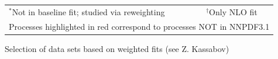 \documentclass{beamer}
\begin{document}
\begin{frame}
\begin{tabularx}{\textwidth}{llXr}
 \multicolumn{3}{l}{$^*$Not in baseline fit; studied via reweighting} &
 \multicolumn{1}{l}{$^\dag$Only NLO fit}\\
 \multicolumn{4}{l}{Processes highlighted in \alert{red} correspond to processes NOT in NNPDF3.1}\\
 \end{tabularx}
 \vspace{-0.2cm}
 \scriptsize
 \begin{block}{}
  \centering
  Selection of data sets based on weighted fits (see Z. Kassabov)\\
 \end{block}
\end{frame}

\end{document}
